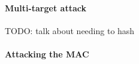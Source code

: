 \documentclass[runningheads]{llncs}
\begin{document}
\paragraph{Multi-target attack} TODO: talk about needing to hash 

\paragraph{Attacking the MAC}



\end{document}
